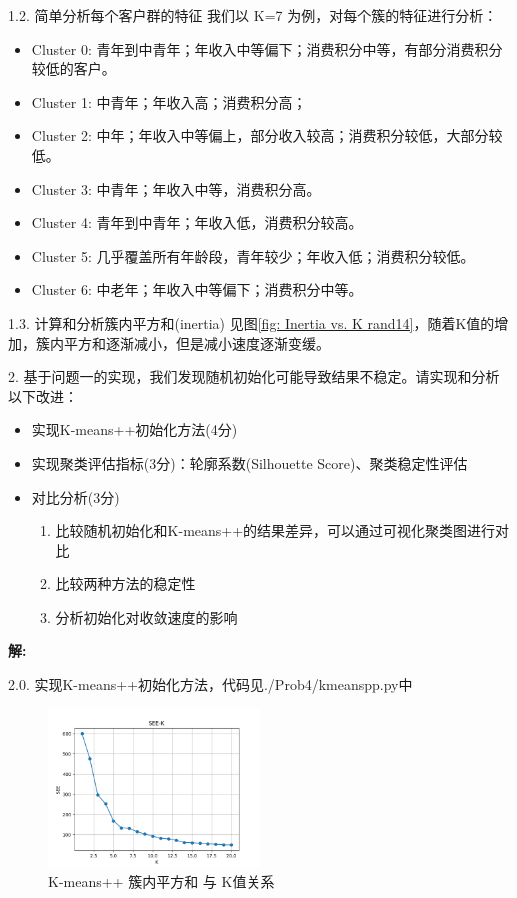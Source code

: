 \documentclass[8pt]{article}
\begin{document}
1.2. 简单分析每个客户群的特征 我们以 K=7 为例，对每个簇的特征进行分析：

\begin{itemize}
    \item Cluster 0: 青年到中青年；年收入中等偏下；消费积分中等，有部分消费积分较低的客户。
    \item Cluster 1: 中青年；年收入高；消费积分高；
    \item Cluster 2: 中年；年收入中等偏上，部分收入较高；消费积分较低，大部分较低。
    \item Cluster 3: 中青年；年收入中等，消费积分高。
    \item Cluster 4: 青年到中青年；年收入低，消费积分较高。
    \item Cluster 5: 几乎覆盖所有年龄段，青年较少；年收入低；消费积分较低。
    \item Cluster 6: 中老年；年收入中等偏下；消费积分中等。
\end{itemize}

1.3. 计算和分析簇内平方和(inertia) 见图\ref{fig: Inertia vs. K rand14}，随着K值的增加，簇内平方和逐渐减小，但是减小速度逐渐变缓。

\vspace{3em}

2. 基于问题一的实现，我们发现随机初始化可能导致结果不稳定。请实现和分析以下改进：
\begin{itemize}
    \item 实现K-means++初始化方法(4分)
    \item 实现聚类评估指标(3分)：轮廓系数(Silhouette Score)、聚类稳定性评估
    \item 对比分析(3分)
    \begin{enumerate}
        \item 比较随机初始化和K-means++的结果差异，可以通过可视化聚类图进行对比
\item 比较两种方法的稳定性
\item 分析初始化对收敛速度的影响
    \end{enumerate}
\end{itemize}

\textbf{\large 解:}

2.0. 实现K-means++初始化方法，代码见{\color{blue}./Prob4/kmeans\text{\_}pp.py中}

\begin{figure}[H]
    \centering
    \includegraphics[width=0.5\textwidth]{./Prob4/out/task2_rand14/SEE-K.png}
    \caption{K-means++ 簇内平方和 与 K值关系}
    \label{fig: Inertia vs. K rand14 pp}
\end{figure}
\end{document}
